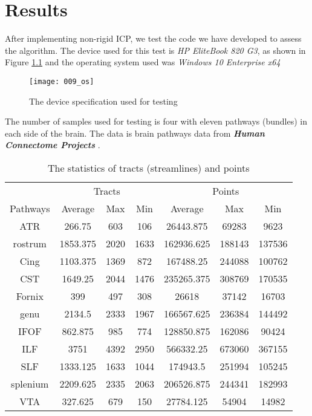 \documentclass[../structure.tex]{subfiles}
\begin{document}
\chapter{Results}
\hspace{2em}After implementing non-rigid ICP, we test the code we have developed to assess the algorithm. The device used for this test is \textit{HP EliteBook 820 G3}, as shown in Figure \ref{fig:OS} and the operating system used was \textit{Windows 10 Enterprise x64}

\begin{figure}[h!]
\centering
\texttt{[image: 009\_os]}
\captionsetup{justification=centering}
\caption{The device specification used for testing}
\label{fig:OS}
\end{figure}

The number of samples used for testing is four with eleven pathways (bundles) in each side of the brain. The data is brain pathways data from \textbf{\textit{Human Connectome Projects}} \cite{CCF}.
\begin{center}
\begin{table}[h!]
	\begin{tabular}{| c | c  c  c | c  c  c |}
	\toprule
	&\multicolumn{3}{c}{Tracts}&\multicolumn{3}{c}{Points}\\
Pathways&Average&Max&Min&Average&Max&Min\\
\midrule
ATR&266.75&603&106&26443.875&69283&9623\\
rostrum&1853.375&2020&1633&162936.625&188143&137536\\
Cing&1103.375&1369&872&167488.25&244088&100762\\
CST&1649.25&2044&1476&235265.375&308769&170535\\
Fornix&399&497&308&26618&37142&16703\\
genu&2134.5&2333&1967&166567.625&236384&144492\\
IFOF&862.875&985&774&128850.875&162086&90424\\
ILF&3751&4392&2950&566332.25&673060&367155\\
SLF&1333.125&1633&1044&174943.5&251994&105245\\
splenium&2209.625&2335&2063&206526.875&244341&182993\\
VTA&327.625&679&150&27784.125&54904&14982\\
\bottomrule
	\end{tabular}
\caption{The statistics of tracts (streamlines) and points}
\label{table:data}
\end{table}
\end{center}
\end{document}

